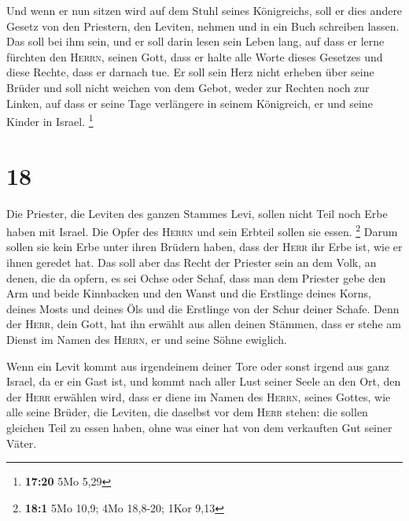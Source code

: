  Und wenn er nun sitzen wird auf dem Stuhl seines
Königreichs, soll er dies andere Gesetz von den Priestern, den Leviten,
nehmen und in ein Buch schreiben lassen.  Das soll bei
ihm sein, und er soll darin lesen sein Leben lang, auf dass er lerne
fürchten den \textsc{Herrn}, seinen Gott, dass er halte alle Worte
dieses Gesetzes und diese Rechte, dass er darnach tue. 
Er soll sein Herz nicht erheben über seine Brüder und soll nicht weichen
von dem Gebot, weder zur Rechten noch zur Linken, auf dass er seine Tage
verlängere in seinem Königreich, er und seine Kinder in Israel.
\footnote{\textbf{17:20} 5Mo 5,29}

\hypertarget{section-3}{%
\section{18}\label{section-3}}

 Die Priester, die Leviten des ganzen Stammes Levi, sollen
nicht Teil noch Erbe haben mit Israel. Die Opfer des \textsc{Herrn} und
sein Erbteil sollen sie essen. \footnote{\textbf{18:1} 5Mo 10,9; 4Mo
  18,8-20; 1Kor 9,13}  Darum sollen sie kein Erbe unter
ihren Brüdern haben, dass der \textsc{Herr} ihr Erbe ist, wie er ihnen
geredet hat.  Das soll aber das Recht der Priester sein an
dem Volk, an denen, die da opfern, es sei Ochse oder Schaf, dass man dem
Priester gebe den Arm und beide Kinnbacken und den Wanst 
und die Erstlinge deines Korns, deines Mosts und deines Öls und die
Erstlinge von der Schur deiner Schafe.  Denn der
\textsc{Herr}, dein Gott, hat ihn erwählt aus allen deinen Stämmen, dass
er stehe am Dienst im Namen des \textsc{Herrn}, er und seine Söhne
ewiglich.

 Wenn ein Levit kommt aus irgendeinem deiner Tore oder
sonst irgend aus ganz Israel, da er ein Gast ist, und kommt nach aller
Lust seiner Seele an den Ort, den der \textsc{Herr} erwählen wird,
 dass er diene im Namen des \textsc{Herrn}, seines Gottes,
wie alle seine Brüder, die Leviten, die daselbst vor dem \textsc{Herr}
stehen:  die sollen gleichen Teil zu essen haben, ohne was
einer hat von dem verkauften Gut seiner Väter.

